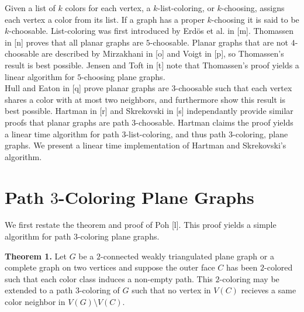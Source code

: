 \documentclass[11pt,letter]{article}
\begin{document}
\noindent Given a list of $k$ colors for each vertex, a $k$-list-coloring, or $k$-choosing, assigns each vertex a
color from its list.
If a graph has a proper $k$-choosing it is said to be $k$-choosable. List-coloring was first introduced by
Erd{\"o}s et al. in [m]. Thomassen in [n] proves that all planar graphs are $5$-choosable. Planar
graphs that are not $4$-choosable are described by Mirzakhani in [o] and Voigt in [p], so Thomassen's result
is best possible. Jensen and Toft in [t] note that Thomassen's proof yields a linear algorithm for $5$-choosing
plane graphs.\\

\noindent Hull and Eaton in [q] prove planar graphs are $3$-choosable such that each vertex shares a color with
at most two neighbors, and furthermore show this result is best possible. Hartman in [r] and Skrekovski in [s]
independantly provide similar proofs that planar graphs are path $3$-choosable. Hartman claims the proof yields
a linear time algorithm for path $3$-list-coloring, and thus path $3$-coloring, plane graphs. We present a
linear time implementation of Hartman and Skrekovski's algorithm.

\section{Path $3$-Coloring Plane Graphs}

We first restate the theorem and proof of Poh [l]. This proof yields a simple algorithm for path $3$-coloring
plane graphs.\\

\begin{adjustwidth}{1.5em}{1.5em}
\noindent\textbf{Theorem 1.} Let $G$ be a $2$-connected weakly triangulated plane graph or a complete
graph on two vertices and
suppose the outer face $C$ has been $2$-colored such that each color class induces a non-empty path. This
$2$-coloring may be extended to a path $3$-coloring of $G$ such that no vertex in $V(C)$ recieves a same color
neighbor in $V(G)\setminus V(C)$.\\
\end{adjustwidth}
\end{document}
